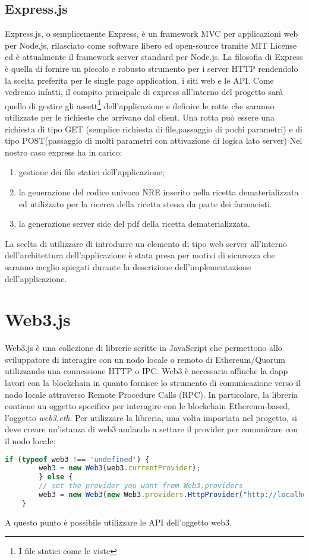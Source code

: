\subsection{Express.js}%
Express.js, o semplicemente Express, è un framework MVC per applicazioni web per Node.js, rilasciato come software libero ed open-source tramite MIT License ed è attualmente il framework server standard per Node.js. La filosofia di Express è quella di fornire un piccolo e robusto strumento per i server HTTP rendendolo la scelta preferita per le single page application, i siti web e le API. Come vedremo infatti, il compito principale di express all'interno del progetto sarà quello di gestire gli assett\footnote{I file statici come le viste} dell'applicazione e definire le rotte che saranno utilizzate per le richieste che arrivano dal client. Una rotta può essere una richiesta di tipo GET (semplice richiesta di file,passaggio di pochi parametri) e di tipo POST(passaggio di molti parametri con attivazione di logica lato server)
Nel nostro caso express ha in carico:
\begin{enumerate}
	\item gestione dei file statici dell'applicazione;
	\item la generazione del codice univoco NRE inserito nella ricetta dematerializzata ed utilizzato per la ricerca della ricetta stessa da parte dei farmacisti.
	\item la generazione server side del pdf della ricetta dematerializzata.
\end{enumerate}
La scelta di utilizzare di introdurre un elemento di tipo web server all'interno dell'architettura dell'applicazione è stata presa per motivi di sicurezza che saranno meglio spiegati durante la descrizione dell'implementazione dell'applicazione. 
%
\section{Web3.js} %
Web3.js è una collezione di librerie scritte in JavaScript che permettono allo sviluppatore di interagire con un nodo locale o remoto di Ethereum/Quorum utilizzando una connessione HTTP o IPC. Web3 è necessaria affinche la dapp lavori con la blockchain in quanto fornisce lo strumento di comunicazione verso il nodo locale attraverso Remote Procedure Calls (RPC). In particolare, la libreria contiene un oggetto specifico per interagire con le blockchain Ethereum-based, l'oggetto \emph{web3.eth}. Per utilizzare la libreria, una volta importata nel progetto, si deve creare un'istanza di web3 andando a settare il provider per comunicare con il nodo locale:
\begin{lstlisting}[language=javascript]
	if (typeof web3 !== 'undefined') {
		web3 = new Web3(web3.currentProvider);
		} else {
		// set the provider you want from Web3.providers
		web3 = new Web3(new Web3.providers.HttpProvider("http://localhost:22000"));
	}
\end{lstlisting}%
A questo punto è possibile utilizzare le API dell'oggetto web3.
%
